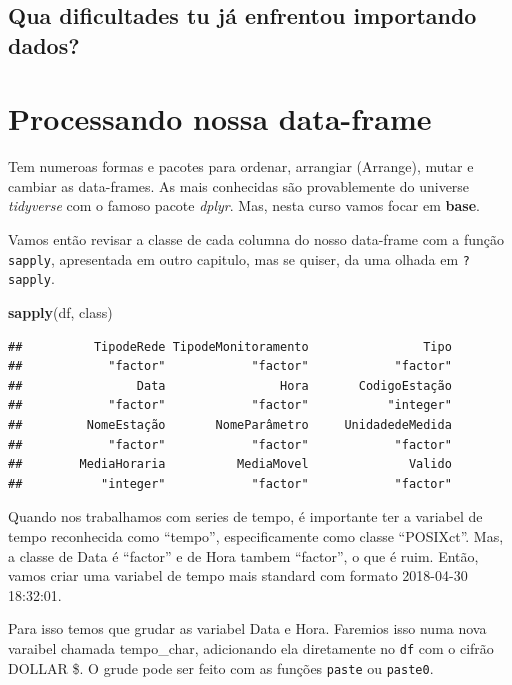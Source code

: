 \documentclass[]{book}
\newenvironment{Shaded}{\begin{snugshade}}{\end{snugshade}}
\newcommand{\KeywordTok}[1]{\textcolor[rgb]{0.13,0.29,0.53}{\textbf{#1}}}
\newcommand{\NormalTok}[1]{#1}
\theoremstyle{definition}
\theoremstyle{definition}
\theoremstyle{definition}
\theoremstyle{remark}
\begin{document}
\subsection{Qua dificultades tu já enfrentou importando
dados?}\label{qua-dificultades-tu-ja-enfrentou-importando-dados}

\section{Processando nossa
data-frame}\label{processando-nossa-data-frame}

Tem numeroas formas e pacotes para ordenar, arrangiar (Arrange), mutar e
cambiar as data-frames. As mais conhecidas são provablemente do universe
\emph{tidyverse} com o famoso pacote \emph{dplyr}. Mas, nesta curso
vamos focar em \textbf{base}.

Vamos então revisar a classe de cada columna do nosso data-frame com a
função \texttt{sapply}, apresentada em outro capitulo, mas se quiser, da
uma olhada em \texttt{?sapply}.

\begin{Shaded}
\begin{Highlighting}[]
\KeywordTok{sapply}\NormalTok{(df, class)}
\end{Highlighting}
\end{Shaded}

\begin{verbatim}
##          TipodeRede TipodeMonitoramento                Tipo 
##            "factor"            "factor"            "factor" 
##                Data                Hora       CodigoEstação 
##            "factor"            "factor"           "integer" 
##         NomeEstação       NomeParâmetro     UnidadedeMedida 
##            "factor"            "factor"            "factor" 
##        MediaHoraria          MediaMovel              Valido 
##           "integer"            "factor"            "factor"
\end{verbatim}

Quando nos trabalhamos com series de tempo, é importante ter a variabel
de tempo reconhecida como ``tempo'', especificamente como classe
``POSIXct''. Mas, a classe de Data é ``factor'' e de Hora tambem
``factor'', o que é ruim. Então, vamos criar uma variabel de tempo mais
standard com formato 2018-04-30 18:32:01.

Para isso temos que grudar as variabel Data e Hora. Faremios isso numa
nova varaibel chamada tempo\_char, adicionando ela diretamente no
\texttt{df} com o cifrão DOLLAR \$. O grude pode ser feito com as
funções \texttt{paste} ou \texttt{paste0}.
\end{document}
